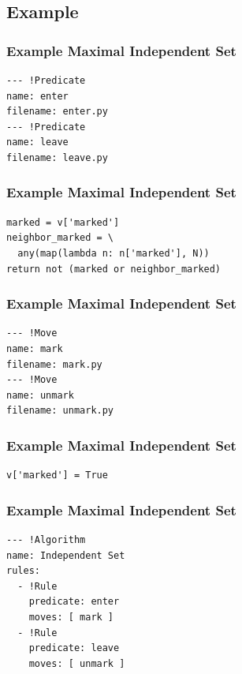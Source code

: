 \documentclass{beamer}
\begin{document}
\subsection{Example}
\begin{frame}[fragile]
  \frametitle{Example \Dash Maximal Independent Set}
\qquad\begin{minipage}{.8\textwidth}
\begin{lstlisting}[style=myyaml]
--- !Predicate
name: enter
filename: enter.py
--- !Predicate
name: leave
filename: leave.py
\end{lstlisting}
\end{minipage}
\end{frame}
\begin{frame}[fragile]
  \frametitle{Example \Dash Maximal Independent Set}
  \vspace{1ex}
\qquad\begin{minipage}{.8\textwidth}
\begin{lstlisting}[style=mypy]
marked = v['marked']
neighbor_marked = \
  any(map(lambda n: n['marked'], N))
return not (marked or neighbor_marked)
\end{lstlisting}
\end{minipage}
\end{frame}
\begin{frame}[fragile]
  \frametitle{Example \Dash Maximal Independent Set}
\qquad\begin{minipage}{.8\textwidth}
\begin{lstlisting}[style=myyaml]
--- !Move
name: mark
filename: mark.py
--- !Move
name: unmark
filename: unmark.py
\end{lstlisting}
\end{minipage}
\end{frame}
\begin{frame}[fragile]
  \frametitle{Example \Dash Maximal Independent Set}
  \vspace{1ex}
\qquad\begin{minipage}{.8\textwidth}
\begin{lstlisting}[style=mypy]
v['marked'] = True
\end{lstlisting}
\end{minipage}
\end{frame}
\begin{frame}[fragile]
  \frametitle{Example \Dash Maximal Independent Set}
\qquad\begin{minipage}{.8\textwidth}
\begin{lstlisting}[style=myyaml]
--- !Algorithm
name: Independent Set
rules:
  - !Rule
    predicate: enter
    moves: [ mark ]
  - !Rule
    predicate: leave
    moves: [ unmark ]
\end{lstlisting}
\end{minipage}
\end{frame}
\end{document}

